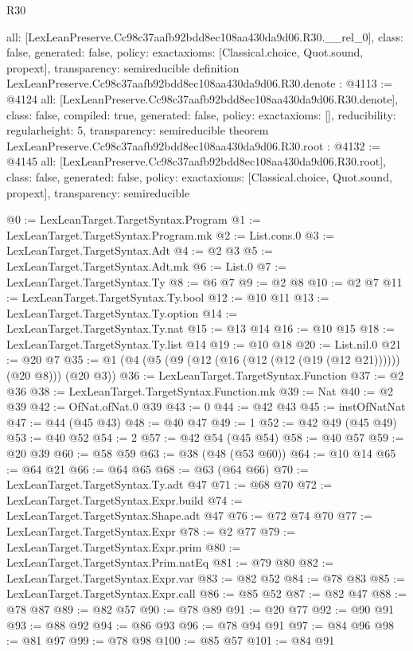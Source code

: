 \begin{lexlean}{R30}
\begin{coremodule}
{  all: [LexLeanPreserve.Cc98c37aafb92bdd8ec108aa430da9d06.R30.__rel_0],
  class: false,
  generated: false,
  policy: exact{axioms: [Classical.choice, Quot.sound, propext]},
  transparency: semireducible
}
definition LexLeanPreserve.Cc98c37aafb92bdd8ec108aa430da9d06.R30.denote : @4113 := @4124 {
  all: [LexLeanPreserve.Cc98c37aafb92bdd8ec108aa430da9d06.R30.denote],
  class: false,
  compiled: true,
  generated: false,
  policy: exact{axioms: []},
  reducibility: regular{height: 5},
  transparency: semireducible
}
theorem LexLeanPreserve.Cc98c37aafb92bdd8ec108aa430da9d06.R30.root : @4132 := @4145 {
  all: [LexLeanPreserve.Cc98c37aafb92bdd8ec108aa430da9d06.R30.root],
  class: false,
  generated: false,
  policy: exact{axioms: [Classical.choice, Quot.sound, propext]},
  transparency: semireducible
}

@0 := LexLeanTarget.TargetSyntax.Program
@1 := LexLeanTarget.TargetSyntax.Program.mk
@2 := List.cons.{0}
@3 := LexLeanTarget.TargetSyntax.Adt
@4 := @2 @3
@5 := LexLeanTarget.TargetSyntax.Adt.mk
@6 := List.{0}
@7 := LexLeanTarget.TargetSyntax.Ty
@8 := @6 @7
@9 := @2 @8
@10 := @2 @7
@11 := LexLeanTarget.TargetSyntax.Ty.bool
@12 := @10 @11
@13 := LexLeanTarget.TargetSyntax.Ty.option
@14 := LexLeanTarget.TargetSyntax.Ty.nat
@15 := @13 @14
@16 := @10 @15
@18 := LexLeanTarget.TargetSyntax.Ty.list @14
@19 := @10 @18
@20 := List.nil.{0}
@21 := @20 @7
@35 := @1 (@4 (@5 (@9 (@12 (@16 (@12 (@12 (@19 (@12 @21)))))) (@20 @8))) (@20 @3))
@36 := LexLeanTarget.TargetSyntax.Function
@37 := @2 @36
@38 := LexLeanTarget.TargetSyntax.Function.mk
@39 := Nat
@40 := @2 @39
@42 := OfNat.ofNat.{0} @39
@43 := 0
@44 := @42 @43
@45 := instOfNatNat
@47 := @44 (@45 @43)
@48 := @40 @47
@49 := 1
@52 := @42 @49 (@45 @49)
@53 := @40 @52
@54 := 2
@57 := @42 @54 (@45 @54)
@58 := @40 @57
@59 := @20 @39
@60 := @58 @59
@63 := @38 (@48 (@53 @60))
@64 := @10 @14
@65 := @64 @21
@66 := @64 @65
@68 := @63 (@64 @66)
@70 := LexLeanTarget.TargetSyntax.Ty.adt @47
@71 := @68 @70
@72 := LexLeanTarget.TargetSyntax.Expr.build
@74 := LexLeanTarget.TargetSyntax.Shape.adt @47
@76 := @72 @74 @70
@77 := LexLeanTarget.TargetSyntax.Expr
@78 := @2 @77
@79 := LexLeanTarget.TargetSyntax.Expr.prim
@80 := LexLeanTarget.TargetSyntax.Prim.natEq
@81 := @79 @80
@82 := LexLeanTarget.TargetSyntax.Expr.var
@83 := @82 @52
@84 := @78 @83
@85 := LexLeanTarget.TargetSyntax.Expr.call
@86 := @85 @52
@87 := @82 @47
@88 := @78 @87
@89 := @82 @57
@90 := @78 @89
@91 := @20 @77
@92 := @90 @91
@93 := @88 @92
@94 := @86 @93
@96 := @78 @94 @91
@97 := @84 @96
@98 := @81 @97
@99 := @78 @98
@100 := @85 @57
@101 := @84 @91

\end{coremodule}
\end{lexlean}
